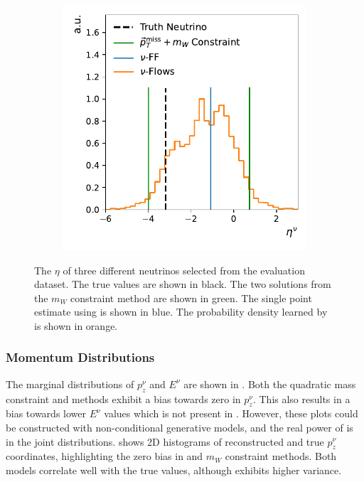\begin{figure}[ht]
\begin{subfigure}{0.32\textwidth}
        \caption{} \label{fig:inf_ambig}
    \end{subfigure}
    \begin{subfigure}{0.32\textwidth}
        \includegraphics[width=\textwidth]{Figures/neutrino_unfolding/eta_12.pdf}
        \caption{} \label{fig:inf_bad}
    \end{subfigure}
    \caption{The $\eta$ of three different neutrinos selected from the evaluation dataset. The true values are shown in black. The two solutions from the $m_W$ constraint method are shown in green. The single point estimate using \vff is shown in blue. The probability density learned by \vflows is shown in orange.}
    \label{fig:inference}
\end{figure}

\subsubsection{Momentum Distributions}

The marginal distributions of $p_z^\nu$ and $E^\nu$ are shown in .
Both the quadratic mass constraint and \vff methods exhibit a bias towards zero in $p_z^\nu$.
This also results in a bias towards lower $E^\nu$ values which is not present in \vsample.
However, these plots could be constructed with non-conditional generative models, and the real power of \vflows is in the joint distributions.
 shows 2D histograms of reconstructed and true $p_z^\nu$ coordinates, highlighting the zero bias in \vff and $m_W$ constraint methods.
Both \vflows models correlate well with the true values, although \vsample exhibits higher variance.

